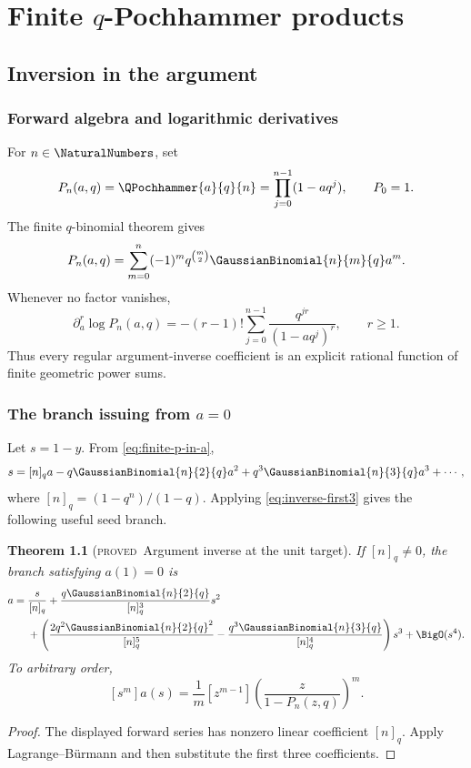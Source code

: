 \documentclass[11pt,letterpaper,oneside,openany]{book}
\newtheorem{theorem}{Theorem}[chapter]
\theoremstyle{definition}
\theoremstyle{remark}
\newcommand{\statusproved}{\textcolor{provedgreen}{\textsc{proved}}}
\begin{document}
\part{Finite \(q\)-Pochhammer products}

\chapter{Inversion in the argument}

\section{Forward algebra and logarithmic derivatives}
For \(n\in\NaturalNumbers\), set
\[
 P_n(a,q)=\QPochhammer{a}{q}{n}=\prod_{j=0}^{n-1}(1-aq^j),
 \qquad P_0=1.
\]
The finite \(q\)-binomial theorem gives
\begin{equation}
 P_n(a,q)=\sum_{m=0}^n(-1)^m q^{\binom m2}
 \GaussianBinomial{n}{m}{q} a^m.
 \label{eq:finite-p-in-a}
\end{equation}
Whenever no factor vanishes,
\begin{equation}
 \partial_a^r\log P_n(a,q)
 =-(r-1)!\sum_{j=0}^{n-1}
 \frac{q^{jr}}{(1-aq^j)^r},
 \qquad r\ge1.
 \label{eq:a-log-derivatives}
\end{equation}
Thus every regular argument-inverse coefficient is an explicit rational
function of finite geometric power sums.

\section{The branch issuing from \(a=0\)}
Let \(s=1-y\).  From \cref{eq:finite-p-in-a},
\[
 s=[n]_q a-q\GaussianBinomial{n}{2}{q}a^2+q^3\GaussianBinomial{n}{3}{q}a^3+\cdots,
\]
where \([n]_q=(1-q^n)/(1-q)\).  Applying
\cref{eq:inverse-first3} gives the following useful seed branch.

\begin{theorem}[\statusproved\ Argument inverse at the unit target]
If \([n]_q\ne0\), the branch satisfying \(a(1)=0\) is
\begin{align}
 a={}&\frac{s}{[n]_q}
 +\frac{q\GaussianBinomial{n}{2}{q}}{[n]_q^3}s^2 \notag \\
 &+\left(
 \frac{2q^2\GaussianBinomial{n}{2}{q}^2}{[n]_q^5}
 -\frac{q^3\GaussianBinomial{n}{3}{q}}{[n]_q^4}
 \right)s^3+\BigO(s^4).
 \label{eq:a-inverse-near-zero}
\end{align}
To arbitrary order,
\[
 [s^m]a(s)=\frac1m[z^{m-1}]
 \left(\frac{z}{1-P_n(z,q)}\right)^m.
\]
\end{theorem}
\begin{proof}
The displayed forward series has nonzero linear coefficient \([n]_q\).  Apply
Lagrange--Bürmann and then substitute the first three coefficients.
\end{proof}
\end{document}
